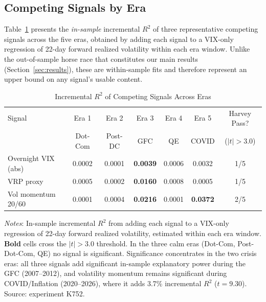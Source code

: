 \documentclass[12pt,a4paper]{article}
\begin{document}
\subsection{Competing Signals by Era}

Table~\ref{tab:competing_eras} presents the \emph{in-sample} incremental $R^2$ of three representative competing signals across the five eras, obtained by adding each signal to a VIX-only regression of 22-day forward realized volatility within each era window. Unlike the out-of-sample horse race that constitutes our main results (Section~\ref{sec:results}), these are within-sample fits and therefore represent an upper bound on any signal's usable content.

\begin{table}[H]
\centering
\small
\begin{threeparttable}
\caption{Incremental $R^2$ of Competing Signals Across Eras}
\label{tab:competing_eras}
\begin{tabular}{@{}lcccccc@{}}
\toprule
Signal & Era 1 & Era 2 & Era 3 & Era 4 & Era 5 & Harvey Pass? \\
 & Dot-Com & Post-DC & GFC & QE & COVID & ($|t|>3.0$) \\
\midrule
Overnight VIX (abs) & 0.0002 & 0.0001 & \textbf{0.0039} & 0.0006 & 0.0032 & 1/5 \\
VRP proxy & 0.0005 & 0.0002 & \textbf{0.0160} & 0.0008 & 0.0005 & 1/5 \\
Vol momentum 20/60 & 0.0001 & 0.0004 & \textbf{0.0216} & 0.0001 & \textbf{0.0372} & 2/5 \\
\bottomrule
\end{tabular}
\begin{tablenotes}
\small
\item \textit{Notes}: In-sample incremental $R^2$ from adding each signal to a VIX-only regression of 22-day forward realized volatility, estimated within each era window. \textbf{Bold} cells cross the \citet{harvey2016} $|t|>3.0$ threshold. In the three calm eras (Dot-Com, Post-Dot-Com, QE) no signal is significant. Significance concentrates in the two crisis eras: all three signals add significant in-sample explanatory power during the GFC (2007--2012), and volatility momentum remains significant during COVID/Inflation (2020--2026), where it adds 3.7\% incremental $R^2$ ($t=9.30$). Source: experiment K752.
\end{tablenotes}
\end{threeparttable}
\end{table}
\end{document}
